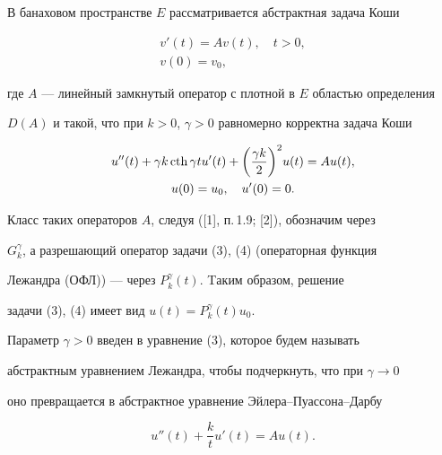 \label{begin}








В банаховом пространстве $E$ рассматривается абстрактная задача Коши


\begin{gather}


v'(t)=Av(t),\quad t>0,\\


v(0)=v_0,


\end{gather}


где $A$ --- линейный замкнутый оператор с плотной в $E$ областью определения


$D(A)$ и такой, что при $k>0$, $\gamma>0$ равномерно корректна задача Коши


\begin{gather}


u''(t)+\gamma k\cth \gamma t u'(t)+


\bigg(\frac{\gamma k}{2} \bigg)^2 u(t)=Au(t),\\


u(0)=u_0,\quad u'(0)=0.


\end{gather}





Класс таких операторов $A$, следуя ([1], п.\,1.9; [2]), обозначим через


$G_k^\gamma$, а разрешающий оператор задачи (3), (4) (операторная функция


Лежандра (ОФЛ)) --- через $P_k^\gamma(t)$. Tаким образом, решение


задачи (3), (4) имеет вид $u(t)=P_k^\gamma(t)u_0$.





Параметр $\gamma>0$ введен в уравнение (3), которое будем называть


абстрактным уравнением Лежандра, чтобы подчеркнуть, что при $\gamma \to 0$


оно превращается в абстрактное уравнение Эйлера--Пуассона--Дарбу


\begin{equation}


u''(t)+\frac{k}{t} u'(t)=Au(t).


\end{equation}






